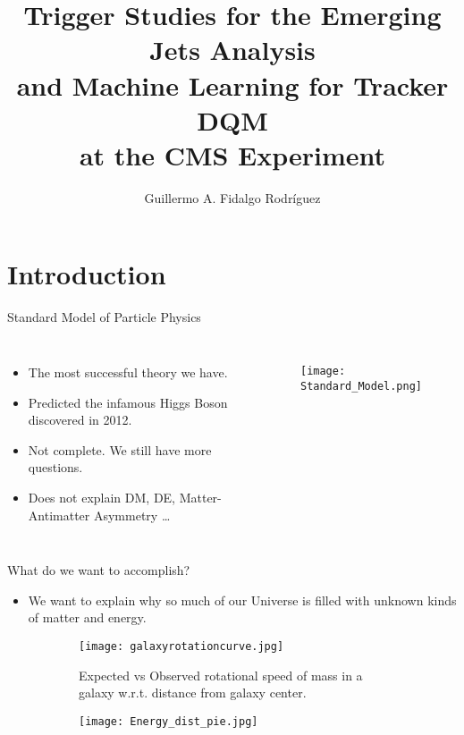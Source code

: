 \documentclass[8pt,aspectratio=169]{beamer}
\title[EMJ and ML4TkDQM]{Trigger Studies for the Emerging Jets Analysis \\and Machine Learning for Tracker DQM \\at the CMS Experiment}
\author[GAFR]{Guillermo A. Fidalgo Rodríguez}
\institute[UPRM]{University of Puerto Rico - Mayagüez}
\begin{document}
\maketitle

\begin{frame}
	\Large
	\tableofcontents
\end{frame}

\section{Introduction}

\begin{frame}{Standard Model of Particle Physics}
	\begin{columns}

		\begin{itemize}
			\item The most successful theory we have.
			\item Predicted the infamous Higgs Boson discovered in 2012.
			\item Not complete. We still have more questions.
			\item Does not explain DM, DE, Matter-Antimatter Asymmetry \dots
		\end{itemize}
		\begin{figure}
			\texttt{[image: Standard\_Model.png]}
		\end{figure}
	\end{columns}
\end{frame}

\begin{frame}{What do we want to accomplish?}
	\begin{itemize}
		\item We want to explain why so much of our Universe is filled with unknown kinds of matter and energy.
	\end{itemize}
	\begin{figure}
		\centering
		\begin{subfigure}[t]{0.45\linewidth}
			\texttt{[image: galaxyrotationcurve.jpg]}
			\caption{Expected vs Observed rotational speed of mass in a galaxy w.r.t. distance from galaxy center.}
		\end{subfigure}
		\begin{subfigure}{0.45\linewidth}
			\texttt{[image: Energy\_dist\_pie.jpg]}
		\end{subfigure}
	\end{figure}
\end{frame}
\end{document}
